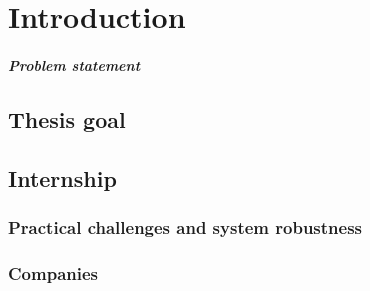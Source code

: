 
\chapter{Introduction} 

\paragraph{Problem statement}


\section{Thesis goal}


\section{Internship}

\subsection{Practical challenges and system robustness}

\subsection{Companies}

